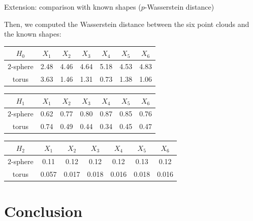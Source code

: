 \documentclass[xcolor={dvipsnames,svgnames}]{beamer}
\begin{document}
\begin{frame}{Extension: comparison with known shapes ($p$-Wasserstein distance)}

Then, we computed the Wasserstein distance between the six point clouds and the known shapes:

\begin{table}[!htbp]
        \centering
        \small
        \setlength\tabcolsep{5pt}
        \begin{tabular}{|c|c|c|c|c|c|c|}
\hline
  $H_0$& $X_1$ & $X_2$ & $X_3$ & $X_4$ & $X_5$ & $X_6$ \\ \hline
$2$-sphere & 2.48 & 4.46&  4.64 & 5.18 & 4.53 & 4.83\\\hline
torus & 3.63 &  1.46 & 1.31 & 0.73 & 1.38 & 1.06 \\ \hline
\end{tabular}
\end{table}


\begin{table}[!htbp]
        \centering
        \small
        \setlength\tabcolsep{5pt}
        \begin{tabular}{|c|c|c|c|c|c|c|}
\hline
$H_1$& $X_1$ & $X_2$ & $X_3$ & $X_4$ & $X_5$ & $X_6$ \\ \hline
$2$-sphere & 0.62 &   0.77 & 0.80 & 0.87 & 0.85 & 0.76\\\hline
torus & 0.74 & 0.49 & 0.44 & 0.34 & 0.45 & 0.47\\ \hline
\end{tabular}
\end{table}

\begin{table}[!htbp]
        \centering
        \small
        \setlength\tabcolsep{5pt}
        \begin{tabular}{|c|c|c|c|c|c|c|}
\hline
$H_2$ & $X_1$ & $X_2$ & $X_3$ & $X_4$ & $X_5$ & $X_6$ \\ \hline
$2$-sphere & 0.11 &   0.12 & 0.12 & 0.12 & 0.13 & 0.12\\\hline
torus & 0.057 & 0.017 & 0.018  & 0.016 & 0.018 & 0.016 \\ \hline
\end{tabular}
\end{table}
\end{frame}

\section{Conclusion}
\end{document}

